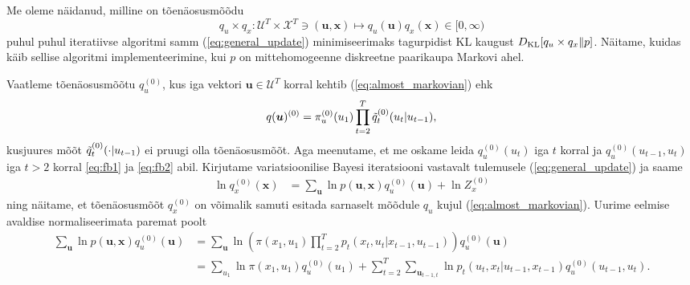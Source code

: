 
Me oleme näidanud, milline on tõenäosusmõõdu 
$$q_u \times q_x: \mathcal{U}^T \times \mathcal{X}^T \ni (\bm{u},\bm{x}) \mapsto q_u(\bm{u}) q_x(\bm{x}) \in [0, \infty)$$ 
puhul puhul iteratiivse algoritmi samm (\ref{eq:general_update}) minimiseerimaks tagurpidist KL kaugust $ D_{\mathrm{KL}}[q_u \times q_x \| p]$. Näitame, kuidas käib sellise algoritmi implementeerimine, kui $p$ on mittehomogeenne diskreetne paarikaupa Markovi ahel.

Vaatleme tõenäosusmõõtu $q_u^{(0)}$, kus iga vektori $\bm{u} \in \mathcal{U}^T$ korral kehtib (\ref{eq:almost_markovian}) ehk
\begin{equation*}
    q(\bm{u})^{(0)} = \pi_u^{(0)}(u_1) \prod_{t=2}^T \Tilde{q}_t^{(0)}(u_t|u_{t-1}),
\end{equation*}
kusjuures mõõt $\Tilde{q}_t^{(0)}(\cdot|u_{t-1})$ ei pruugi olla tõenäosusmõõt. Aga meenutame, et me oskame leida $q_u^{(0)}(u_t)$ iga $t$ korral ja $q_u^{(0)}(u_{t-1},u_t)$ iga $t>2$ korral \eqref{eq:fb1} ja \eqref{eq:fb2} abil.
Kirjutame variatsioonilise Bayesi iteratsiooni vastavalt tulemusele (\ref{eq:general_update}) ja saame
\begin{align*}
    \ln q_x^{(0)}(\bm{x}) &= \sum_{\bm{u}} \ln p(\bm{u},\bm{x}) q_u^{(0)}(\bm{u}) + \ln Z_x^{(0)}
\end{align*}
ning näitame, et tõenäosusmõõt $q_x^{(0)}$ on võimalik samuti esitada sarnaselt mõõdule $q_u$ kujul (\ref{eq:almost_markovian}). Uurime eelmise avaldise normaliseerimata paremat poolt
\begin{align*}
    \sum_{\bm{u}} \ln p(\bm{u},\bm{x}) q_u^{(0)}(\bm{u}) &=  \sum_{\bm{u}} \ln \left( \pi(x_1, u_1) \prod_{t=2}^T p_t(x_t,u_t | x_{t-1}, u_{t-1}) \right) q_u^{(0)}(\bm{u}) \\
    &= \sum_{u_1} \ln \pi(x_1, u_1) q_u^{(0)}(u_1)  + \sum_{t=2}^T \sum_{\bm{u}_{t-1,t}} \ln p_t(u_t,x_t | u_{t-1}, x_{t-1}) q_u^{(0)}(u_{t-1},u_{t}).
\end{align*}

